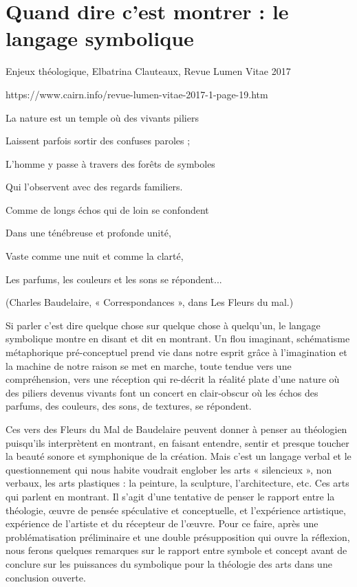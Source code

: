 \section{Quand dire c’est montrer : le langage symbolique}

\vspace{0.24cm}
{\footnotesize Enjeux théologique, Elbatrina Clauteaux, Revue Lumen Vitae 2017

https://www.cairn.info/revue-lumen-vitae-2017-1-page-19.htm}
\vspace{0.31cm}


\hfill
\begin{minipage}[c]{.65\linewidth}
La nature est un temple où des vivants piliers

Laissent parfois sortir des confuses paroles ;

L’homme y passe à travers des forêts de symboles

Qui l’observent avec des regards familiers.

Comme de longs échos qui de loin se confondent

Dans une ténébreuse et profonde unité,

Vaste comme une nuit et comme la clarté,

Les parfums, les couleurs et les sons se répondent...

{\scriptsize (Charles Baudelaire, « Correspondances », dans Les Fleurs du mal.)}
\end{minipage}
\hfill
\vspace{0.31cm}

Si parler c’est dire quelque chose sur quelque chose à quelqu’un, le langage symbolique montre en disant et dit en montrant. Un flou imaginant, schématisme métaphorique pré-conceptuel prend vie dans notre esprit grâce à l’imagination et la machine de notre raison se met en marche, toute tendue vers une compréhension, vers une réception qui re-décrit la réalité plate d’une nature où des piliers devenus vivants font un concert en clair-obscur où les échos des parfums, des couleurs, des sons, de textures, se répondent.

Ces vers des Fleurs du Mal de Baudelaire peuvent donner à penser au théologien puisqu’ils interprètent en montrant, en faisant entendre, sentir et presque toucher la beauté sonore et symphonique de la création. Mais c’est un langage verbal et le questionnement qui nous habite voudrait englober les arts « silencieux », non verbaux, les arts plastiques : la peinture, la sculpture, l’architecture, etc. Ces arts qui parlent en montrant. Il s’agit d’une tentative de penser le rapport entre la théologie, œuvre de pensée spéculative et conceptuelle, et l’expérience artistique, expérience de l’artiste et du récepteur de l’œuvre. Pour ce faire, après une problématisation préliminaire et une double présupposition qui ouvre la réflexion, nous ferons quelques remarques sur le rapport entre symbole et concept avant de conclure sur les puissances du symbolique pour la théologie des arts dans une conclusion ouverte.

